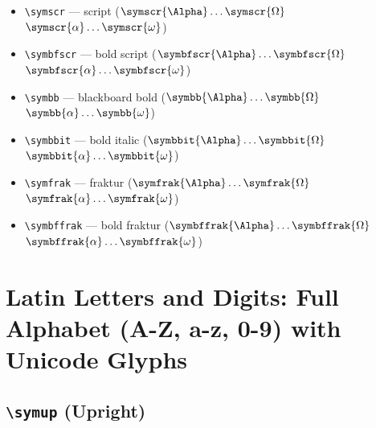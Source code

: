 \documentclass[12pt,a4paper]{article}
\begin{document}
\begin{itemize}
    \item \texttt{\textbackslash{}symscr} --- script ($\symscr{\Alpha} \ldots \symscr{\Omega}$ $\symscr{\alpha} \ldots \symscr{\omega}$)
    \item \texttt{\textbackslash{}symbfscr} --- bold script ($\symbfscr{\Alpha} \ldots \symbfscr{\Omega}$ $\symbfscr{\alpha} \ldots \symbfscr{\omega}$)
    \item \texttt{\textbackslash{}symbb} --- blackboard bold ($\symbb{\Alpha} \ldots \symbb{\Omega}$ $\symbb{\alpha} \ldots \symbb{\omega}$)
    \item \texttt{\textbackslash{}symbbit} --- bold italic ($\symbbit{\Alpha} \ldots \symbbit{\Omega}$ $\symbbit{\alpha} \ldots \symbbit{\omega}$)
    \item \texttt{\textbackslash{}symfrak} --- fraktur ($\symfrak{\Alpha} \ldots \symfrak{\Omega}$ $\symfrak{\alpha} \ldots \symfrak{\omega}$)
    \item \texttt{\textbackslash{}symbffrak} --- bold fraktur ($\symbffrak{\Alpha} \ldots \symbffrak{\Omega}$ $\symbffrak{\alpha} \ldots \symbffrak{\omega}$)
\end{itemize}

\newpage

\section*{Latin Letters and Digits: Full Alphabet (A-Z, a-z, 0-9) with Unicode Glyphs}

\subsection*{\texttt{\textbackslash{}symup} (Upright)}
\end{document}
